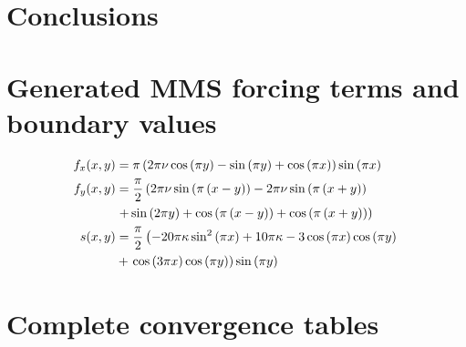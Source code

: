 \documentclass[11pt,a4paper]{article}
\begin{document}
\section{Conclusions}

\appendix
\section{Generated MMS forcing terms and boundary values}\label{appendix:generated_sources}
\begin{subequations}
  \begin{align}
    f_x(x,y) &= \pi \left(2 \pi \nu \cos{\left(\pi y \right)} - \sin{\left(\pi y \right)} + \cos{\left(\pi x \right)}\right) \sin{\left(\pi x \right)} \\
    f_y(x,y) &= \frac{\pi}{2} \left(2 \pi \nu \sin{\left(\pi \left(x - y\right) \right)} - 2 \pi \nu \sin{\left(\pi \left(x + y\right) \right)} \right. \\ \notag
    & \left. + \sin{\left(2 \pi y \right)} + \cos{\left(\pi \left(x - y\right) \right)} + \cos{\left(\pi \left(x + y\right) \right)}\right) \\
    s(x,y) &= \frac{\pi}{2} \left(- 20 \pi \kappa \sin^{2}{\left(\pi x \right)} + 10 \pi \kappa - 3 \cos{\left(\pi x \right)} \cos{\left(\pi y \right)} \right. \\ \notag
    &+ \left. \cos{\left(3 \pi x \right)} \cos{\left(\pi y \right)}\right) \sin{\left(\pi y \right)}
  \end{align}
\end{subequations}

\section{Complete convergence tables}

\printbibliography
\end{document}
